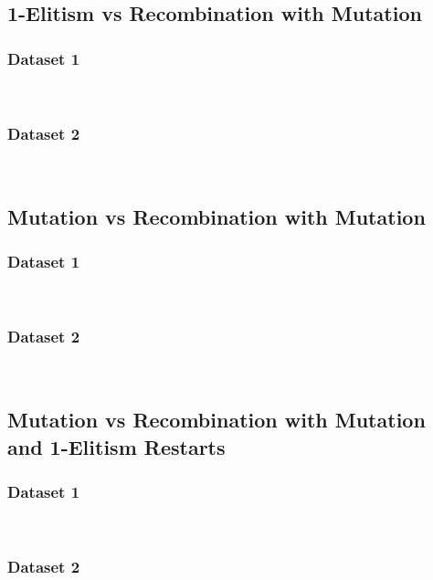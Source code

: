 \documentclass{article}
\begin{document}
\subsection{1-Elitism vs Recombination with Mutation}
\subsubsection{Dataset 1}
\begin{paragraph}
\\
\end{paragraph}
\subsubsection{Dataset 2}
\begin{paragraph}
\\
\end{paragraph}
\subsection{Mutation vs Recombination with Mutation}
\subsubsection{Dataset 1}
\begin{paragraph}
\\
\end{paragraph}
\subsubsection{Dataset 2}
\begin{paragraph}
\\
\end{paragraph}
\subsection{Mutation vs Recombination with Mutation and 1-Elitism Restarts}
\subsubsection{Dataset 1}
\begin{paragraph}
\\
\end{paragraph}
\subsubsection{Dataset 2}
\begin{paragraph}
\\
\end{paragraph}
\end{document}
